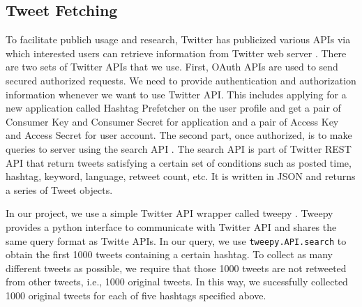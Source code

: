 \documentclass[letterpaper,11pt,twocolumn]{article}
\begin{document}
\subsection{Tweet Fetching}
To facilitate publich usage and research, Twitter has publicized various APIs via which interested users can retrieve information from Twitter web server \cite{twitterdocument}. There are two sets of Twitter APIs that we use. First, OAuth APIs \cite{twitteroauth} are used to send secured authorized requests. We need to provide authentication and authorization information whenever we want to use Twitter API. This includes applying for a new application called Hashtag Prefetcher on the user profile and get a pair of Consumer Key and Consumer Secret for application and a pair of Access Key and Access Secret for user account. The second part, once authorized, is to make queries to server using the search API \cite{twittersearch}. The search API is part of Twitter REST API that return tweets satisfying a certain set of conditions such as posted time, hashtag, keyword, language, retweet count, etc. It is written in JSON and returns a series of Tweet objects.

In our project, we use a simple Twitter API wrapper called tweepy \cite{tweepy}. Tweepy provides a python interface to communicate with Twitter API and shares the same query format as Twitte APIs. In our query, we use \texttt{tweepy.API.search} to obtain the first 1000 tweets containing a certain hashtag. To collect as many different tweets as possible, we require that those 1000 tweets are not retweeted from other tweets, i.e., 1000 original tweets. In this way, we sucessfully collected 1000 original tweets for each of five hashtags specified above.
\end{document}

